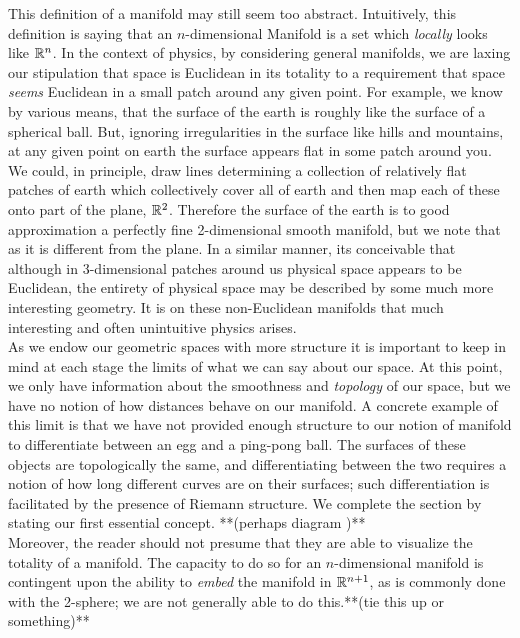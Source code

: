 This definition of a manifold may still seem too abstract.  Intuitively, this definition is saying that an $n$-dimensional Manifold is a set which \textit{locally} looks like $\mathbb{R}^n$.  In the context of physics, by considering general manifolds, we are laxing our stipulation that space is Euclidean in its totality to a requirement that space \textit{seems} Euclidean in a small patch around any given point. For example, we know by various means, that the surface of the earth is roughly like the surface of a spherical ball.  But, ignoring irregularities in the surface like hills and mountains, at any given point on earth the surface appears flat in some patch around you.  We could, in principle, draw lines determining a collection of relatively flat patches of earth which collectively cover all of earth and then map each of these onto part of the plane, $\mathbb{R}^2$.  Therefore the surface of the earth is to good approximation a perfectly fine 2-dimensional smooth manifold, but we note that as it is different from the plane.  In a similar manner, its conceivable that although in 3-dimensional patches  around us physical space appears to be Euclidean, the entirety of physical space may be described by some much more interesting geometry.  It is on these non-Euclidean manifolds that much interesting and often unintuitive physics arises.\\

As we endow our geometric spaces with more  structure it is important to keep in mind at each stage the limits of what we can say about our space.  At this point, we only have information about the smoothness and \textit{topology} of our space, but we have no notion of how distances behave on our manifold.  A concrete example of this limit is that we have not provided enough structure to our notion of manifold to differentiate between an egg and a  ping-pong ball.  The surfaces of these objects are topologically the same, and differentiating between the two requires a notion of how long different curves are on their surfaces; such differentiation is facilitated by the presence of Riemann structure. We complete the section by stating our first essential concept.  **(perhaps diagram )**\\

Moreover, the reader should not presume that they are able to visualize the totality of a manifold.  The capacity to do so for an $n$-dimensional manifold is contingent upon the ability to \textit{embed} the manifold in $\mathbb{R}^{n+1}$, as is commonly done with the 2-sphere; we are not generally able to do this.**(tie this up or something)**  

